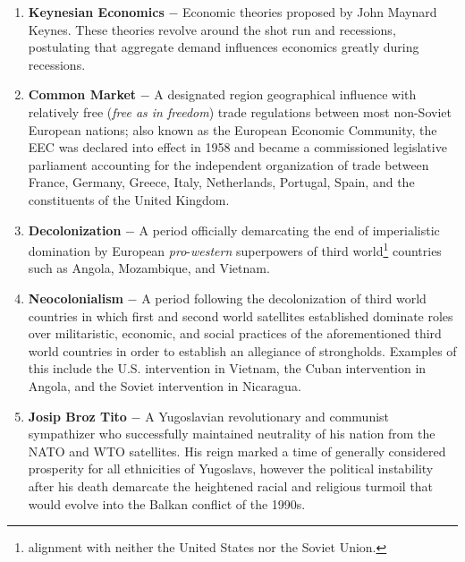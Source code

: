 \documentclass[12pt]{article}
\begin{document}
\begin{flushleft}
\begin{enumerate}
	\item \textbf{Keynesian Economics} $-$ Economic theories proposed by John Maynard Keynes. These theories revolve around the shot run and recessions, postulating that aggregate demand influences economics greatly during recessions.

    \item \textbf{Common Market} $-$ A designated region geographical influence with relatively free (\emph{free as in freedom}) trade regulations between most non-Soviet European nations; also known as the European Economic Community, the EEC was declared into effect in 1958 and became a commissioned legislative parliament accounting for the independent organization of trade between France, Germany, Greece, Italy, Netherlands, Portugal, Spain, and the constituents of the United Kingdom. 

    \item \textbf{Decolonization} $-$ A period officially demarcating the end of imperialistic domination by European \emph{pro}-\emph{western} superpowers of third world\footnote{alignment with neither the United States nor the Soviet Union.} countries such as Angola, Mozambique, and Vietnam.
      
    \item \textbf{Neocolonialism} $-$ A period following the decolonization of third world countries in which first and second world satellites established dominate roles over militaristic, economic, and social practices of the aforementioned third world countries in order to establish an allegiance of strongholds. Examples of this include the U.S. intervention in Vietnam, the Cuban intervention in Angola, and the Soviet intervention in Nicaragua.

    \item \textbf{Josip Broz Tito} $-$ A Yugoslavian revolutionary and communist sympathizer who successfully maintained neutrality of his nation from the NATO and WTO satellites. His reign marked a time of generally considered prosperity for all ethnicities of Yugoslavs, however the political instability after his death demarcate the heightened racial and religious turmoil that would evolve into the Balkan conflict of the 1990s.


\end{enumerate}
\end{flushleft}
\end{document}
